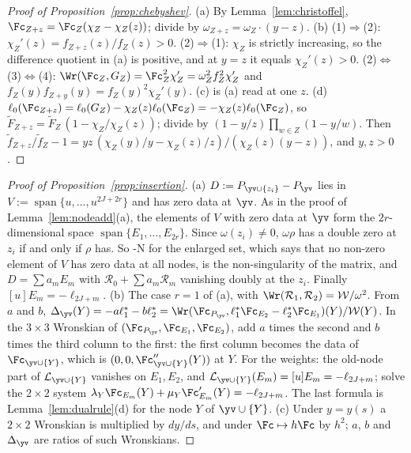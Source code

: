 \begin{proof}[Proof of Proposition~\textup{\ref{prop:chebyshev}}]
(a) By Lemma~\ref{lem:christoffel}, $\Fc_{Z+z}=\Fc_Z(\chi_Z-\chi_Z(z))$; divide by $\omega_{Z+z}=\omega_Z\cdot(y-z)$.
(b) (1)$\Rightarrow$(2): $\chi_Z'(z)=f_{Z+z}(z)/f_Z(z)>0$. (2)$\Rightarrow$(1): $\chi_Z$ is strictly increasing, so the
difference quotient in (a) is positive, and at $y=z$ it equals $\chi_Z'(z)>0$. (2)$\Leftrightarrow$(3)$\Leftrightarrow$(4):
$\Wr(\Fc_Z,G_Z)=\Fc_Z^2\chi_Z'=\omega_Z^2f_Z^2\chi_Z'$ and $f_Z(y)f_{Z+y}(y)=f_Z(y)^2\chi_Z'(y)$. (c) is (a) read at
one $z$. (d) $\ell_0(\Fc_{Z+z})=\ell_0(G_Z)-\chi_Z(z)\ell_0(\Fc_Z)=-\chi_Z(z)\ell_0(\Fc_Z)$, so
$\tilde F_{Z+z}=\tilde F_Z\,(1-\chi_Z/\chi_Z(z))$; divide by $(1-y/z)\prod_{w\in Z}(1-y/w)$. Then
$\tilde f_{Z+z}/\tilde f_Z-1=yz\,(\chi_Z(y)/y-\chi_Z(z)/z)/(\chi_Z(z)(y-z))$, and $y,z>0$.
\end{proof}

\begin{proof}[Proof of Proposition~\textup{\ref{prop:insertion}}]
(a) $D:=P_{\yv\cup\{z_i\}}-P_{\yv}$ lies in $V:=\operatorname{span}\{u,\dots,u^{2J+2r}\}$ and has zero data at $\yv$. As in the
proof of Lemma~\ref{lem:nodeadd}(a), the elements of $V$ with zero data at $\yv$ form the $2r$-dimensional space
$\operatorname{span}\{E_1,\dots,E_{2r}\}$. Since $\omega(z_i)\ne0$, $\omega\rho$ has a double zero at $z_i$ if and only if
$\rho$ has. So \hyp{N} for the enlarged set, which says that no non-zero element of $V$ has zero data at all nodes,
is the non-singularity of the matrix, and $D=\sum a_mE_m$ with $\mathcal R_0+\sum a_m\mathcal R_m$ vanishing doubly at
the $z_i$. Finally $[u]E_m=-\ell_{2J+m}$.
(b) The case $r=1$ of (a), with $\Wr(\mathcal R_1,\mathcal R_2)=\mathcal W/\omega^2$. From $a$ and $b$,
$\Delta_{\yv}(Y)=-a\ell_1^*-b\ell_2^*=\Wr(\Fc_{P_{\yv}},\ell_1^*\Fc_{E_2}-\ell_2^*\Fc_{E_1})(Y)/\mathcal W(Y)$. In the
$3\times3$ Wronskian of $(\Fc_{P_{\yv}},\Fc_{E_1},\Fc_{E_2})$, add $a$ times the second and $b$ times the third
column to the first: the first column becomes the data of $\Fc_{\yv\cup\{Y\}}$, which is $(0,0,\Fc''_{\yv\cup\{Y\}}(Y))$
at $Y$. For the weights: the old-node part of $\mathcal L_{\yv\cup\{Y\}}$ vanishes on $E_1,E_2$, and
$\mathcal L_{\yv\cup\{Y\}}(E_m)=[u]E_m=-\ell_{2J+m}$; solve the $2\times2$ system
$\lambda_Y\Fc_{E_m}(Y)+\mu_Y\Fc_{E_m}'(Y)=-\ell_{2J+m}$. The last formula is Lemma~\ref{lem:dualrule}(d) for the node
$Y$ of $\yv\cup\{Y\}$.
(c) Under $y=y(s)$ a $2\times2$ Wronskian is multiplied by $dy/ds$, and under $\Fc\mapsto h\Fc$ by $h^2$; $a$, $b$
and $\Delta_{\yv}$ are ratios of such Wronskians.
\end{proof}

